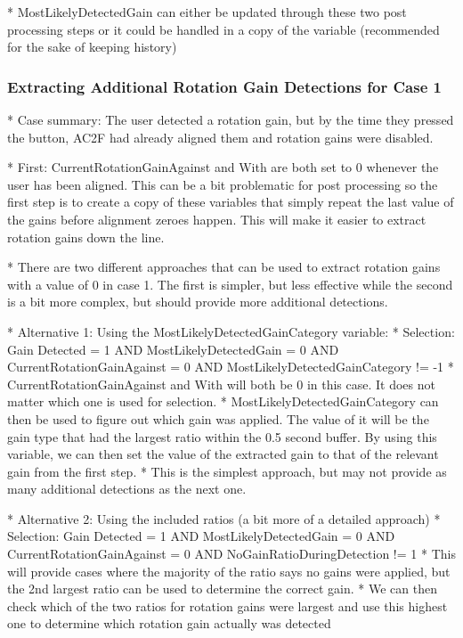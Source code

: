 * MostLikelyDetectedGain can either be updated through these two post processing steps or it could be handled in a copy of the variable (recommended for the sake of keeping history)

\subsubsection{Extracting Additional Rotation Gain Detections for Case 1}
  * Case summary: The user detected a rotation gain, but by the time they pressed the button, AC2F had already aligned them and rotation gains were disabled.

  * First: CurrentRotationGainAgainst and With are both set to 0 whenever the user has been aligned. This can be a bit problematic for post processing so the first step is to create a copy of these variables that simply repeat the last value of the gains before alignment zeroes happen. This will make it easier to extract rotation gains down the line. 

  * There are two different approaches that can be used to extract rotation gains with a value of 0 in case 1. The first is simpler, but less effective while the second is a bit more complex, but should provide more additional detections. 

  * Alternative 1: Using the MostLikelyDetectedGainCategory variable:
     * Selection: Gain Detected = 1 AND MostLikelyDetectedGain = 0 AND CurrentRotationGainAgainst = 0 AND MostLikelyDetectedGainCategory != -1
     * CurrentRotationGainAgainst and With will both be 0 in this case. It does not matter which one is used for selection. 
     * MostLikelyDetectedGainCategory can then be used to figure out which gain was applied. The value of it will be the gain type that had the largest ratio within the 0.5 second buffer. By using this variable, we can then set the value of the extracted gain to that of the relevant gain from the first step. 
     * This is the simplest approach, but may not provide as many additional detections as the next one. 
     
  * Alternative 2: Using the included ratios (a bit more of a detailed approach)
     * Selection: Gain Detected = 1 AND MostLikelyDetectedGain = 0 AND CurrentRotationGainAgainst = 0 AND NoGainRatioDuringDetection != 1
     * This will provide cases where the majority of the ratio says no gains were applied, but the 2nd largest ratio can be used to determine the correct gain. 
     * We can then check which of the two ratios for rotation gains were largest and use this highest one to determine which rotation gain actually was detected

